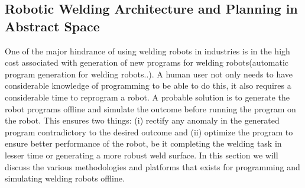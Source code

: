 \subsection{Robotic Welding Architecture and Planning in Abstract Space}
One of the major hindrance of using welding robots in industries is in the high cost associated with generation of new programs for welding robots\cite{14}(automatic program generation for welding robots..). A human user not only needs to have considerable knowledge of programming to be able to do this, it also requires a considerable time to reprogram a robot. A probable solution is to generate the robot programs offline and simulate the outcome before running the program on the robot. This ensures two things: (i) rectify any anomaly in the generated program contradictory to the desired outcome and (ii) optimize the program to ensure better performance of the robot, be it completing the welding task in lesser time or generating a more robust weld surface. In this section we  will discuss the various methodologies and platforms that exists for programming and simulating welding robots offline. 
